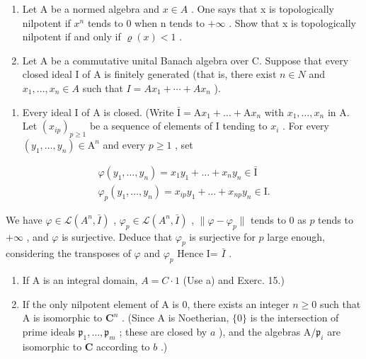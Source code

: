 \begin{enumerate}
\def\labelenumi{\arabic{enumi})}
\setcounter{enumi}{31}
\item
  Let A be a normed algebra and \(x \in A\) . One says that x is topologically nilpotent if \(x^{n}\) tends to 0 when n tends to \(+\infty\) . Show that x is topologically nilpotent if and only if \(\varrho(x) < 1\) .
\item
  Let A be a commutative unital Banach algebra over C. Suppose that every closed ideal I of A is finitely generated (that is, there exist \(n \in N\) and \(x_{1}, \ldots, x_{n} \in A\) such that \(I = Ax_{1} + \cdots + Ax_{n}\) ).
\end{enumerate}

\begin{enumerate}
\def\labelenumi{\alph{enumi})}
\tightlist
\item
  Every ideal I of A is closed. (Write \(\bar{\mathrm{I}} = \mathrm{A}x_{1} + \dots +\mathrm{A}x_{n}\) with \(x_{1},\ldots ,x_{n}\) in A. Let \((x_{ip})_{p\geqslant 1}\) be a sequence of elements of I tending to \(x_{i}\) . For every \((y_{1},\ldots ,y_{n})\in \mathrm{A}^{n}\) and every \(p\geqslant 1\) , set
\end{enumerate}

\[
\begin{array}{c} \varphi (y _ {1}, \ldots , y _ {n}) = x _ {1} y _ {1} + \dots + x _ {n} y _ {n} \in \bar {\mathrm{I}} \\ \varphi_ {p} (y _ {1}, \ldots , y _ {n}) = x _ {i p} y _ {1} + \dots + x _ {n p} y _ {n} \in \mathrm{I}. \end{array}
\]

We have \(\varphi\in\mathcal{L}(A^{n},\bar{I})\) , \(\varphi_{p}\in\mathcal{L}(A^{n},\bar{I})\) , \(\|\varphi-\varphi_{p}\|\) tends to 0 as \(p\) tends to \(+\infty\) , and \(\varphi\) is surjective. Deduce that \(\varphi_{p}\) is surjective for \(p\) large enough, considering the transposes of \(\varphi\) and \(\varphi_{p}\) Hence I= \(\bar{I}\) .

\begin{enumerate}
\def\labelenumi{\alph{enumi})}
\setcounter{enumi}{1}
\item
  If A is an integral domain, \(A = C \cdot 1\) (Use a) and Exerc. 15.)
\item
  If the only nilpotent element of A is 0, there exists an integer \(n \geqslant 0\) such that A is isomorphic to \(\mathbf{C}^n\) . (Since A is Noetherian, \(\{0\}\) is the intersection of prime ideals \(\mathfrak{p}_1, \ldots, \mathfrak{p}_m\) ; these are closed by \(a\) ), and the algebras \(\mathrm{A}/\mathfrak{p}_i\) are isomorphic to \(\mathbf{C}\) according to \(b\) .)
\end{enumerate}

